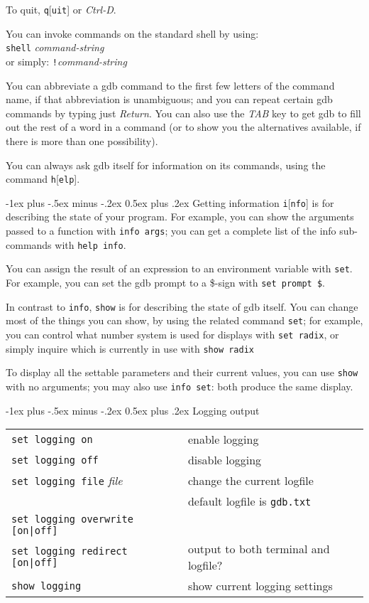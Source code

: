 \documentclass[a4paper,landscape]{article}
\makeatletter
\renewcommand{\section}{\@startsection{section}{1}{0mm}%
                                {-1ex plus -.5ex minus -.2ex}%
                                {0.5ex plus .2ex}%
                                {\normalfont\large\bfseries}}
\makeatother
\begin{document}
\begin{multicols*}{3}
To quit, \texttt{q}[\texttt{uit}] or \textit{Ctrl-D}.

You can invoke commands on the standard shell by using:\\
\texttt{shell}\textit{ command-string} \\
or simply: \texttt{!}\textit{command-string}

You can abbreviate a gdb command to the first few letters of the command name, if that
abbreviation is unambiguous; and you can repeat certain gdb commands by typing just
\textit{Return}. You can also use the \textit{TAB} key to get gdb to fill out the rest of a word in a command (or to show you the alternatives available, if there is more than one possibility).

You can always ask gdb itself for information on its commands, using the command \texttt{h}[\texttt{elp}].

\section{Getting information}
\texttt{i}[\texttt{nfo}] is for describing the state of your program. For
example, you can show the arguments passed to a function with \texttt{info args};
you can get a complete list of the info sub-commands with \texttt{help info}.

You can assign the result of an expression to an environment variable with \texttt{set}.
For example, you can set the gdb prompt to a \$-sign with \texttt{set prompt \$}.

In contrast to \texttt{info}, \texttt{show} is for describing the state of gdb itself. You can
change most of the things you can show, by using the related command \texttt{set};
for example, you can control what number system is used for displays with \texttt{set
radix}, or simply inquire which is currently in use with \texttt{show radix}

To display all the settable parameters and their current values, you can use
\texttt{show} with no arguments; you may also use \texttt{info set}: both produce
the same display.

\section{Logging output}
\begin{tabular}{@{}ll@{}}
\texttt{set logging on} & enable logging \\
\texttt{set logging off} & disable logging \\
\texttt{set logging file}\textit{ file} & change the current logfile \\
	& default logfile is \texttt{gdb.txt} \\
\texttt{set logging overwrite [on|off]} & \\
\texttt{set logging redirect [on|off]} & output to both terminal and logfile? \\
\texttt{show logging} & show current logging settings
\end{tabular}


\end{multicols*}
\end{document}
